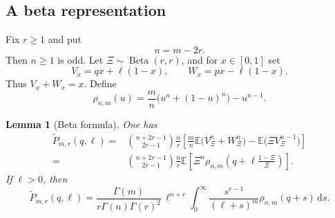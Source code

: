 \documentclass[11pt]{article}
\newtheorem{lemma}[theorem]{Lemma}
\newcommand{\dd}{\,\mathrm d}
\newcommand{\E}{\mathbb E}
\newcommand{\BetaLaw}{\operatorname{Beta}}
\begin{document}
\subsection{A beta representation}

Fix \(r\ge1\) and put
\begin{equation}\label{eq:dense-n}
       n=m-2r.
\end{equation}
Then \(n\ge1\) is odd.  Let \(\Xi\sim\BetaLaw(r,r)\), and for \(x\in[0,1]\)
set
\begin{equation}\label{eq:dense-VW}
       V_x=qx+\ell(1-x),
       \qquad
       W_x=px-\ell(1-x).
\end{equation}
Thus \(V_x+W_x=x\).  Define
\begin{equation}\label{eq:dense-rho}
       \rho_{n,m}(u)
       =\frac mn\bigl(u^n+(1-u)^n\bigr)-u^{n-1}.
\end{equation}

\begin{lemma}[Beta formula]\label{lem:dense-beta}
One has
\begin{align}
 \widetilde P_{m,r}(q,\ell)
 ={}&\binom{n+2r-1}{2r-1}\frac nr
 \left[
   \frac mn\E\bigl(V_\Xi^n+W_\Xi^n\bigr)
   -\E\bigl(\Xi V_\Xi^{n-1}\bigr)
 \right]\label{eq:dense-beta-first}\\
 ={}&\binom{n+2r-1}{2r-1}\frac nr
 \E\left[
   \Xi^n\rho_{n,m}\left(q+\ell\frac{1-\Xi}{\Xi}\right)
 \right].\label{eq:dense-beta-second}
\end{align}
If \(\ell>0\), then
\begin{equation}\label{eq:dense-beta-integral}
 \widetilde P_{m,r}(q,\ell)
 =\frac{\Gamma(m)}{r\Gamma(n)\Gamma(r)^2}\,
  \ell^{n+r}
  \int_0^\infty
  \frac{s^{r-1}}{(\ell+s)^m}\rho_{n,m}(q+s)\dd s.
\end{equation}
\end{lemma}
\end{document}
